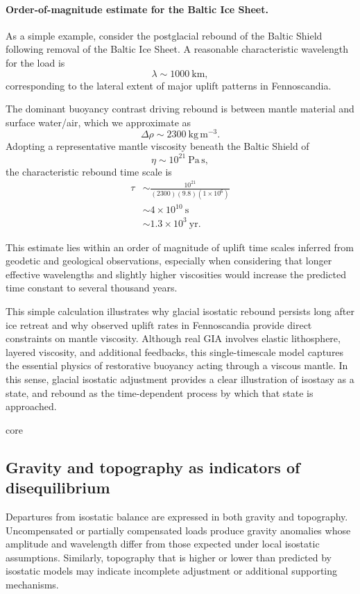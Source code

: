 {    \paragraph{Order-of-magnitude estimate for the Baltic Ice Sheet.}

    As a simple example, consider the postglacial rebound of the Baltic Shield following removal of the Baltic Ice Sheet. A reasonable characteristic wavelength for the load is
    \[
    \lambda \sim 1000~\mathrm{km},
    \]
    corresponding to the lateral extent of major uplift patterns in Fennoscandia.

    The dominant buoyancy contrast driving rebound is between mantle material and surface water/air, which we approximate as
    \[
    \Delta\rho \sim 2300~\mathrm{kg\,m^{-3}}.
    \]
    Adopting a representative mantle viscosity beneath the Baltic Shield of
    \[
    \eta \sim 10^{21}~\mathrm{Pa\,s},
    \]
    the characteristic rebound time scale is
    \begin{align}
    \tau 
    &\sim \frac{10^{21}}{(2300)(9.8)(1\times10^{6})} \\
    &\sim 4\times10^{10}~\mathrm{s} \\
    &\sim 1.3\times10^{3}~\mathrm{yr}.
    \end{align}

    This estimate lies within an order of magnitude of uplift time scales inferred from geodetic and geological observations, especially when considering that longer effective wavelengths and slightly higher viscosities would increase the predicted time constant to several thousand years.

    This simple calculation illustrates why glacial isostatic rebound persists long after ice retreat and why observed uplift rates in Fennoscandia provide direct constraints on mantle viscosity. Although real GIA involves elastic lithosphere, layered viscosity, and additional feedbacks, this single-timescale model captures the essential physics of restorative buoyancy acting through a viscous mantle. In this sense, glacial isostatic adjustment provides a clear illustration of isostasy as a state, and rebound as the time-dependent process by which that state is approached.
}{core}

\subsection{Gravity and topography as indicators of disequilibrium}

Departures from isostatic balance are expressed in both gravity and topography. Uncompensated or partially compensated loads produce gravity anomalies whose amplitude and wavelength differ from those expected under local isostatic assumptions. Similarly, topography that is higher or lower than predicted by isostatic models may indicate incomplete adjustment or additional supporting mechanisms.

